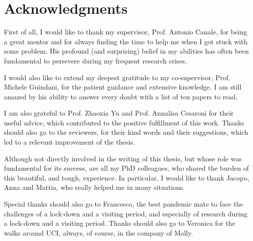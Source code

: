 \chapter*{Acknowledgments} 

First of all, I would like to thank my supervisor, Prof. Antonio Canale, for being a great mentor and for always finding the time to help me when I got stuck with some problem. His profound (and surprising) belief in my abilities has often been fundamental to persevere during my frequent research crises.

I would also like to extend my deepest gratitude to my co-supervisor, Prof. Michele Guindani, for the patient guidance and extensive knowledge. I am still amazed by his ability to answer every doubt with a list of ten papers to read.

I am also grateful to Prof. Zhaoxia Yu and Prof. Annalisa Cesaroni for their useful advice, which contributed to the positive fulfillment of this work. Thanks should also go to the reviewers, for their kind words and their suggestions, which led to a relevant improvement of the thesis.

Although not directly involved in the writing of this thesis, but whose role was fundamental for its success, are all my PhD colleagues, who shared the burden of this beautiful, and tough, experience. In particular, I would like to thank Jacopo, Anna and Mattia, who really helped me in many situations.

Special thanks should also go to Francesco, the best pandemic mate to face the challenges of a lock-down and a visiting period, and especially of research during a lock-down and a visiting period. Thanks should also go to Veronica for the walks around UCI, always, of course, in the company of Molly.
